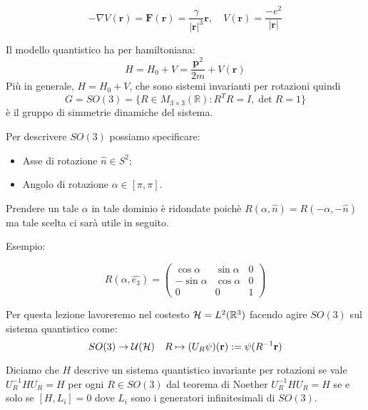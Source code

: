 \begin{equation*}
-\nabla V(\mathbf{r}) = \mathbf{F}(\mathbf{r}) = \dfrac{\gamma}{|\mathbf{r}|^3}\mathbf{r} , \quad V(\mathbf{r}) = \frac{-e^2}{|\mathbf{r}|}
\end{equation*}

Il modello quantistico ha per hamiltoniana:
\begin{equation*}
H = H_0 + V = \frac{\mathbf{p}^2}{2m} + V(\mathbf{r})
\end{equation*}
Più in generale, $H = H_0 + V$, che sono sistemi invarianti per rotazioni quindi 
\begin{equation*}
G = SO(3) = \{R \in M_{3 \times 3}(\mathbb{R}) : R^T R = I, \det R = 1\}
\end{equation*}
è il gruppo di simmetrie dinamiche del sistema.

Per descrivere $SO(3)$ possiamo specificare:
\begin{itemize}
    \item Asse di rotazione $\hat{n} \in S^2$;
    \item Angolo di rotazione $\alpha \in [\pi, \pi]$.
\end{itemize}

Prendere un tale $\alpha$ in tale dominio è ridondate poichè $R(\alpha, \hat{n}) = R(-\alpha, -\hat{n})$ ma tale scelta ci sarà utile in seguito.

Esempio:

\begin{equation*}
    R(\alpha, \hat{e_3}) = \begin{pmatrix}
    \cos \alpha & \sin \alpha & 0 \\           
    -\sin \alpha & \cos \alpha & 0 \\
    0 & 0 & 1   
\end{pmatrix}
\end{equation*}

Per questa lezione lavoreremo nel costesto $\operatorname{\mathcal{H}} = L^2(\mathbb{R}^3)$ facendo agire $SO(3)$ sul sistema quantistico come:
\begin{equation*}
   SO(3) \to \mathcal{U}(\operatorname{\mathcal{H}}) \quad R \mapsto (U_R \psi)(\mathbf{r}) := \psi(R^{-1}\mathbf{r})
\end{equation*}

Diciamo che $H$ descrive un sistema quantistico invariante per rotazioni se vale $U^{-1}_R H U_R = H$ per ogni $R \in SO(3)$ dal teorema di Noether $U^{-1}_R H U_R = H$ se e solo se $[H, L_i] = 0$ dove $L_i$ sono i generatori infinitesimali di $SO(3)$.


